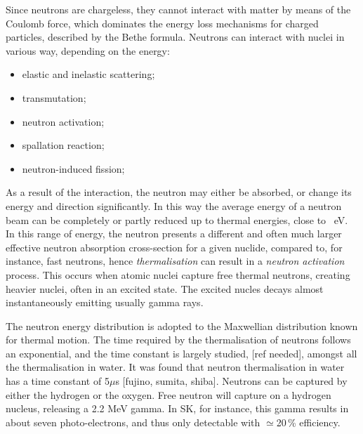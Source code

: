 Since neutrons are chargeless, they cannot interact with matter by means of the Coulomb force, %
which dominates the energy loss mechanisms for charged particles, described by the Bethe formula.
Neutrons can interact with nuclei in various way, depending on the energy:
\begin{itemize}
	\item elastic and inelastic scattering;
	\item transmutation;
	\item neutron activation;
	\item spallation reaction;
	\item neutron-induced fission;
\end{itemize}

As a result of the interaction, the neutron may either be absorbed, or change its energy and direction significantly.
In this way the average energy of a neutron beam can be completely or partly reduced up to thermal energies, %
close to ~eV.
In this range of energy, the neutron presents a different and often much larger effective neutron absorption %
cross-section for a given nuclide, compared to, for instance, fast neutrons, hence \emph{thermalisation} can %
result in a \emph{neutron activation} process.
This occurs when atomic nuclei capture free thermal neutrons, creating heavier nuclei, often in an excited state.
The excited nucles decays almost instantaneously emitting usually gamma rays.

The neutron energy distribution is adopted to the Maxwellian distribution known for thermal motion.
The time required by the thermalisation of neutrons follows an exponential, and the time constant is largely %
studied, [ref needed], amongst all the thermalisation in water.
It was found that neutron thermalisation in water has a time constant of 5$\mu$s [fujino, sumita, shiba].
Neutrons can be captured by either the hydrogen or the oxygen.
Free neutron will capture on a hydrogen nucleus, releasing a 2.2 MeV gamma.
In SK, for instance, this gamma results in about seven photo-electrons, and thus only detectable with $\simeq$20\,\% %
efficiency.

